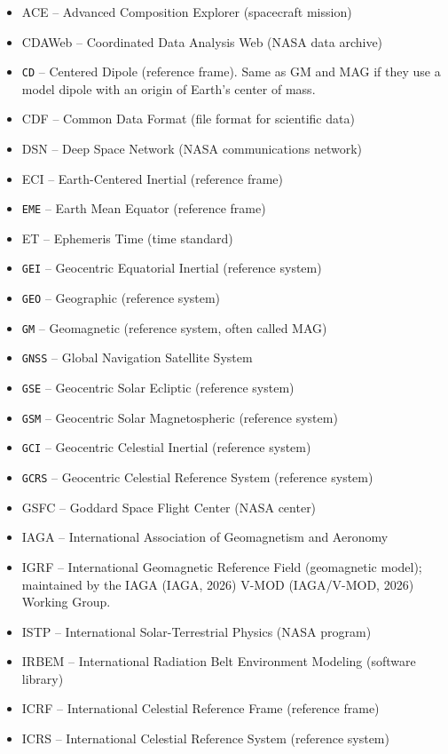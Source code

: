 \documentclass[draft]{agujournal2019}
\begin{document}
\begin{itemize}
\item ACE -- Advanced Composition Explorer (spacecraft mission)
\item CDAWeb -- Coordinated Data Analysis Web (NASA data archive)
\item \texttt{CD} -- Centered Dipole (reference frame). Same as GM and MAG if they use a model dipole with an origin of Earth's center of mass.
\item CDF -- Common Data Format (file format for scientific data)
\item DSN -- Deep Space Network (NASA communications network)
\item ECI -- Earth-Centered Inertial (reference frame)
\item  \texttt{EME} -- Earth Mean Equator (reference frame)
\item  ET -- Ephemeris Time (time standard)
\item  \texttt{GEI} -- Geocentric Equatorial Inertial (reference system)
\item  \texttt{GEO} -- Geographic (reference system)
\item  \texttt{GM} -- Geomagnetic (reference system, often called MAG)
\item  \texttt{GNSS} -- Global Navigation Satellite System
\item  \texttt{GSE} -- Geocentric Solar Ecliptic (reference system)
\item  \texttt{GSM} -- Geocentric Solar Magnetospheric (reference system)
\item  \texttt{GCI} -- Geocentric Celestial Inertial (reference system)
\item  \texttt{GCRS} -- Geocentric Celestial Reference System (reference system)
\item GSFC -- Goddard Space Flight Center (NASA center)
\item IAGA -- International Association of Geomagnetism and Aeronomy
\item IGRF -- International Geomagnetic Reference Field (geomagnetic model); maintained by the IAGA (IAGA, 2026) V-MOD (IAGA/V-MOD, 2026) Working Group.
\item ISTP -- International Solar-Terrestrial Physics (NASA program)
\item IRBEM -- International Radiation Belt Environment Modeling (software library)
\item ICRF -- International Celestial Reference Frame (reference frame)
\item ICRS -- International Celestial Reference System (reference system)

\end{itemize}
\end{document}
